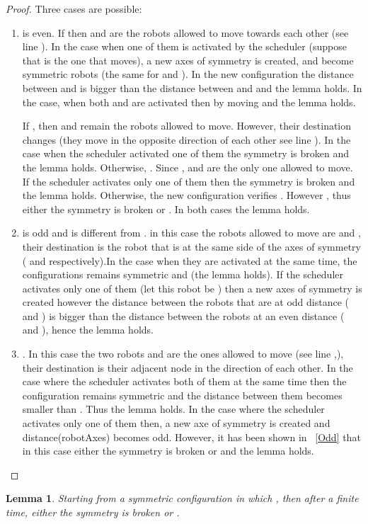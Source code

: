 \documentclass[12pt]{llncs}
\newtheorem{lem}{Lemma}
\begin{document}
\begin{proof}
Three cases are possible:
\begin{enumerate}
\item\label{even}{ is even}. If  then  and  are the robots allowed to move towards each other (see line ). In the case when one of them is activated by the scheduler (suppose that  is the one that moves), a new axes of symmetry is created,  and  become symmetric robots (the same for  and ). In the new configuration the distance between  and  is bigger than the distance between  and  and the lemma holds. In the case, when both   and  are activated then by moving  and the lemma holds. 

If , then  and  remain the robots allowed to move. However, their destination changes (they move in the opposite direction of each other see line ). In the case when the scheduler activated one of them the symmetry is broken and the lemma holds. Otherwise, . Since ,  and  are the only one allowed to move. If the scheduler activates only one of them then the symmetry is broken and the lemma holds. Otherwise, the new configuration verifies . However , thus either the symmetry is broken or . In both cases the lemma holds.    

\item\label{Odd}{ is odd and is different from }. in this case the robots allowed to move are  and , their destination is the robot that is at the same side of the axes of symmetry ( and  respectively).In the case when they are activated at the same time, the configurations remains symmetric and  (the lemma holds). If the scheduler activates only one of them (let this robot be ) then a new axes of symmetry is created however the distance between the robots that are at odd distance ( and ) is bigger than the distance between the robots at an even distance ( and ), hence the lemma holds. 

\item\label{Odd1}{}. In this case the two robots  and  are the ones allowed to move (see line ,), their destination is their adjacent node in the direction of each other. In the case where the scheduler activates both of them at the same time then the configuration remains symmetric and the distance between them becomes smaller than . Thus the lemma holds. In the case where the scheduler activates only one of them then, a new axe of symmetry is created and distance(robotAxes) becomes odd. However, it has been shown in ~\ref{Odd} that in this case either the symmetry is broken or  and the lemma holds. \end{enumerate}
\end{proof}
\begin{lem}
\label{lem:EvbOd}
Starting from a symmetric configuration in which , then after a finite time, either the symmetry is broken or .  
\end{lem}
\end{document}
